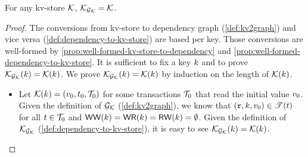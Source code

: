 \begin{proposition}
    \label{prop:bijection:mkvs-dgraph}
For any kv-store $\mathcal{K}$, $\mathcal{K}_{\mathcal{G}_{\mathcal{K}}} = \mathcal{K}$.
\end{proposition}
\begin{proof}
The conversions from kv-store to dependency graph (\cref{def:kv2graph}) and vice versa (\cref{def:dependency-to-kv-store}) are based per key.
Those conversions are well-formed by \cref{prop:well-formed-kv-store-to-dependency} and \cref{prop:well-formed-dependency-to-kv-store}.
It is sufficient to fix a key \( k \) and to prove \( \mathcal{K}_{\mathcal{G}_{\mathcal{K}}}(k) = \mathcal{K}(k) \).
We prove \( \mathcal{K}_{\mathcal{G}_{\mathcal{K}}}(k) = \mathcal{K}(k) \) by induction on the length of \( \mathcal{K}(k) \).

\begin{itemize}
    \item {}
Let \( \mathcal{K}(k) = (v_0, t_0, \mathcal{T}_0 ) \) for some transactions \( \mathcal{T}_0 \) that read the initial value \( v_0 \).
Given the definition of \( \mathcal{G}_{\mathcal{K}} \) (\cref{def:kv2graph}), we know that \( (\textnormal{\texttt r}, k, v_0 ) \in \mathscr{T}(t) \) for all \( t \in \mathcal{T}_0 \) and \( \mathsf{WW}(k) = \mathsf{WR}(k) = \mathsf{RW}(k) = \emptyset  \).
Given the definition of \( \mathcal{K}_{\mathcal{G}_{\mathcal{K}}}\) (\cref{def:dependency-to-kv-store}), it is easy to see \( \mathcal{K}_{\mathcal{G}_{\mathcal{K}}}(k) = \mathcal{K}(k) \).


\end{itemize}
\end{proof}
